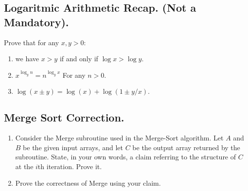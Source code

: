 \ifdefined\SOLUTION
\fi

\subsection{Logaritmic Arithmetic Recap. (Not a Mandatory).} 
 Prove that for any $x,y > 0$:
\begin{enumerate}
  \item we have $x>y$ if and only if $\log x > \log y$. 
  \item $x^{\log_{y}n} = n^{\log_{y}x}$ For any $n > 0$. 
  \item $\log (x \pm y) = \log (x) + \log (1 \pm y/x)$. 
\end{enumerate}

\ifdefined\SOLUTION

\fi

\subsection{Merge Sort Correction.}
\begin{enumerate}
\item Consider the Merge subroutine used in the Merge-Sort algorithm. Let $A$ and $B$ be the given input arrays, and let $C$ be the output array returned by the subroutine. State, in your own words, a claim referring to the structure of $C$ at the $i$th iteration. Prove it.
\item Prove the correctness of Merge using your claim.
\end{enumerate}
\ifdefined\SOLUTION
